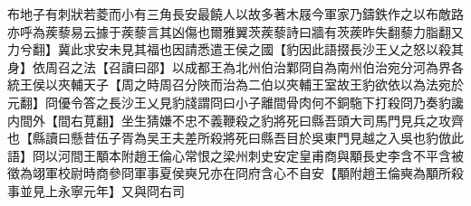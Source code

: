 布地子有刺狀若菱而小有三角長安最饒人以故多著木屐今軍家乃鑄鉄作之以布敵路亦呼為蒺藜易云據于蒺藜言其凶傷也爾雅翼茨蒺藜詩曰牆有茨蒺昨失翻藜力脂翻又力兮翻】冀此求安未見其福也因請悉遣王侯之國【豹因此語掇長沙王乂之怒以殺其身】依周召之法【召讀曰邵】以成都王為北州伯治鄴冏自為南州伯治宛分河為界各統王侯以夾輔天子【周之時周召分陜而治為二伯以夾輔王室故王豹欲依以為法宛於元翻】冏優令答之長沙王乂見豹牋謂冏曰小子離間骨肉何不銅駞下打殺冏乃奏豹讒内間外【間右莧翻】坐生猜嫌不忠不義鞭殺之豹將死曰縣吾頭大司馬門見兵之攻齊也【縣讀曰懸昔伍子胥為吴王夫差所殺將死曰縣吾目於吳東門見越之入吳也豹倣此語】冏以河間王顒本附趙王倫心常恨之梁州刺史安定皇甫商與顒長史李含不平含被徵為翊軍校尉時商參冏軍事夏侯奭兄亦在冏府含心不自安【顒附趙王倫奭為顒所殺事並見上永寧元年】又與冏右司